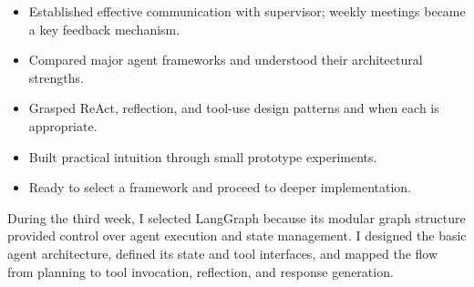 
\begin{itemize}
    \item Established effective communication with supervisor; weekly meetings became a key feedback mechanism.
    \item Compared major agent frameworks and understood their architectural strengths.
    \item Grasped ReAct, reflection, and tool-use design patterns and when each is appropriate.
    \item Built practical intuition through small prototype experiments.
    \item Ready to select a framework and proceed to deeper implementation.
\end{itemize}


During the third week, I selected LangGraph because its modular graph structure provided control over agent execution and state management. I designed the basic agent architecture, defined its state and tool interfaces, and mapped the flow from planning to tool invocation, reflection, and response generation. 


